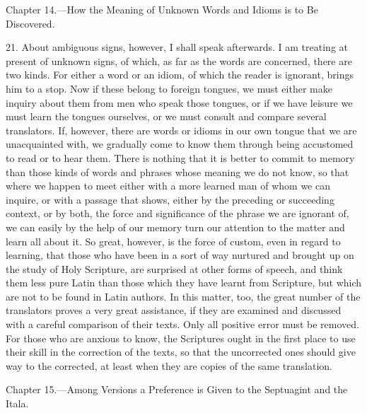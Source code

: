 
Chapter 14.—How the Meaning of Unknown Words and Idioms is to Be Discovered.

21. About ambiguous signs, however, I shall speak afterwards. I am treating at present of unknown signs, of which, as far as the words are concerned, there are two kinds. For either a word or an idiom, of which the reader is ignorant, brings him to a stop. Now if these belong to foreign tongues, we must either make inquiry about them from men who speak those tongues, or if we have leisure we must learn the tongues ourselves, or we must consult and compare several translators. If, however, there are words or idioms in our own tongue that we are unacquainted with, we gradually come to know them through being accustomed to read or to hear them. There is nothing that it is better to commit to memory than those kinds of words and phrases whose meaning we do not know, so that where we happen to meet either with a more learned man of whom we can inquire, or with a passage that shows, either by the preceding or succeeding context, or by both, the force and significance of the phrase we are ignorant of, we can easily by the help of our memory turn our attention to the matter and learn all about it. So great, however, is the force of custom, even in regard to learning, that those who have been in a sort of way nurtured and brought up on the study of Holy Scripture, are surprised at other forms of speech, and think them less pure Latin than those which they have learnt from Scripture, but which are not to be found in Latin authors. In this matter, too, the great number of the translators proves a very great assistance, if they are examined and discussed with a careful comparison of their texts. Only all positive error must be removed. For those who are anxious to know, the Scriptures ought in the first place to use their skill in the correction of the texts, so that the uncorrected ones should give way to the corrected, at least when they are copies of the same translation.


Chapter 15.—Among Versions a Preference is Given to the Septuagint and the Itala.

